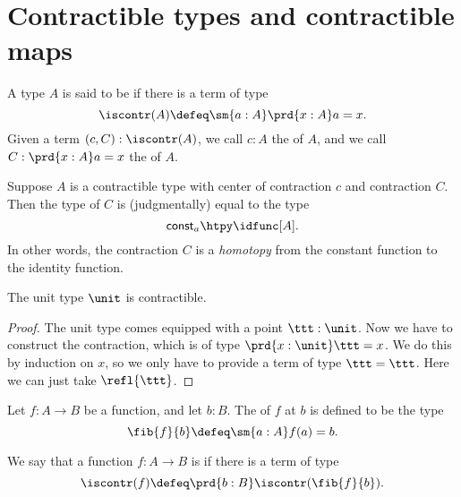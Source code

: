 \section{Contractible types and contractible maps}

\begin{defn}
A type $A$ is said to be  if there is a term of type
\begin{equation*}
\iscontr(A) \defeq \sm{a:A}\prd{x:A}a=x.
\end{equation*}
Given a term $(c,C):\iscontr(A)$, we call $c:A$ the  of $A$, and we call $C:\prd{x:A}a=x$ the  of $A$.
\end{defn}

\begin{rmk}
Suppose $A$ is a contractible type with center of contraction $c$ and contraction $C$. Then the type of $C$ is (judgmentally) equal to the type
\begin{equation*}
\mathsf{const}_a\htpy\idfunc[A].
\end{equation*}
In other words, the contraction $C$ is a \emph{homotopy} from the constant function to the identity function.
\end{rmk}

\begin{thm}
The unit type $\unit$ is contractible.
\end{thm}

\begin{proof}
The unit type comes equipped with a point $\ttt:\unit$. Now we have to construct the contraction, which is of type $\prd{x:\unit}\ttt=x$. We do this by induction on $x$, so we only have to provide a term of type $\ttt=\ttt$. Here we can just take $\refl{\ttt}$. 
\end{proof}

\begin{defn}
Let $f:A\to B$ be a function, and let $b:B$. The  of $f$ at $b$ is defined to be the type
\begin{equation*}
\fib{f}{b}\defeq\sm{a:A}f(a)=b.
\end{equation*}
\end{defn}

\begin{defn}
We say that a function $f:A\to B$ is  if there is a term of type
\begin{equation*}
\iscontr(f)\defeq\prd{b:B}\iscontr(\fib{f}{b}).
\end{equation*}
\end{defn}

